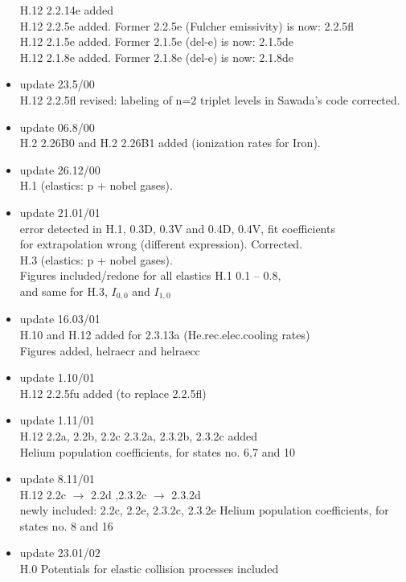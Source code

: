 \documentclass[12pt,dvipdfmx]{article}
\begin{document}
\begin{itemize}
  H.12 2.2.14e added                          \\
  H.12 2.2.5e added. Former 2.2.5e (Fulcher emissivity) is now:
                            2.2.5fl\\
  H.12 2.1.5e added. Former 2.1.5e (del-e) is now: 2.1.5de \\
  H.12 2.1.8e added. Former 2.1.8e (del-e) is now: 2.1.8de
 \item update  23.5/00 \\
  H.12 2.2.5fl revised: labeling of n=2 triplet levels in Sawada's
  code corrected.
 \item update  06.8/00 \\
  H.2 2.26B0 and H.2 2.26B1 added (ionization rates for Iron).
 \item update  26.12/00 \\
  H.1 (elastics: p + nobel gases).
 \item update  21.01/01 \\
  error detected in H.1, 0.3D, 0.3V and 0.4D, 0.4V, fit coefficients\\
  for extrapolation wrong (different expression). Corrected.\\
  H.3 (elastics: p + nobel gases).\\
  Figures included/redone for all elastics H.1  0.1 -- 0.8, \\
  and same for H.3, $I_{0,0}$ and $I_{1,0}$
 \item update  16.03/01 \\
  H.10 and H.12 added for 2.3.13a (He.rec.elec.cooling rates)\\
  Figures added, helraecr and helraecc
 \item update  1.10/01 \\
  H.12  2.2.5fu added (to replace 2.2.5fl)
 \item update  1.11/01 \\
  H.12  2.2a, 2.2b, 2.2c 2.3.2a, 2.3.2b, 2.3.2c added \\
  Helium population coefficients, for states no. 6,7 and 10
 \item update  8.11/01 \\
  H.12  2.2c $\rightarrow$ 2.2d ,2.3.2c $\rightarrow$ 2.3.2d \\
  newly included: 2.2c, 2.2e,  2.3.2c,  2.3.2e
  Helium population coefficients, for states no. 8 and 16
 \item update  23.01/02 \\
  H.0  Potentials for elastic collision processes included\\

\end{itemize}
\end{document}
